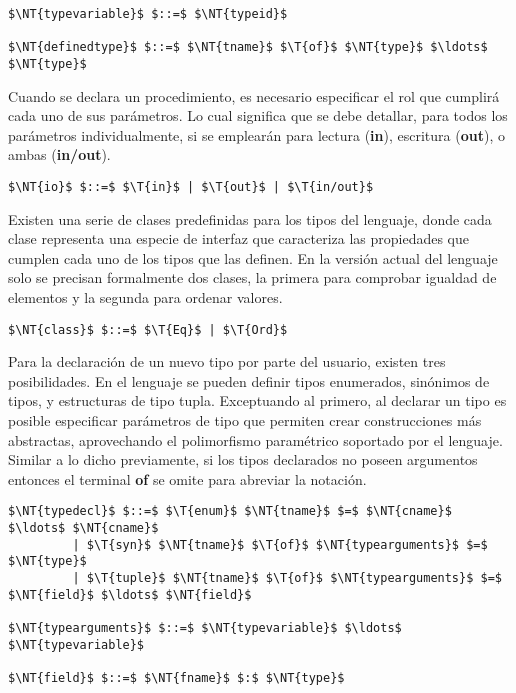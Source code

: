 \begin{lstlisting}[style = syntax]
$\NT{typevariable}$ $::=$ $\NT{typeid}$

$\NT{definedtype}$ $::=$ $\NT{tname}$ $\T{of}$ $\NT{type}$ $\ldots$ $\NT{type}$
\end{lstlisting}

Cuando se declara un procedimiento, es necesario especificar el rol que cumplirá cada uno de sus parámetros.
Lo cual significa que se debe detallar, para todos los parámetros individualmente, si se emplearán para lectura (\textbf{in}), escritura (\textbf{out}), o ambas (\textbf{in/out}).

\begin{lstlisting}[style = syntax]
$\NT{io}$ $::=$ $\T{in}$ | $\T{out}$ | $\T{in/out}$
\end{lstlisting}

Existen una serie de clases predefinidas para los tipos del lenguaje, donde cada clase representa una especie de interfaz que caracteriza las propiedades que cumplen cada uno de los tipos que las definen.
En la versión actual del lenguaje solo se precisan formalmente dos clases, la primera para comprobar igualdad de elementos y la segunda para ordenar valores.

\begin{lstlisting}[style = syntax]
$\NT{class}$ $::=$ $\T{Eq}$ | $\T{Ord}$
\end{lstlisting}

Para la declaración de un nuevo tipo por parte del usuario, existen tres posibilidades.
En el lenguaje se pueden definir tipos enumerados, sinónimos de tipos, y estructuras de tipo tupla.
Exceptuando al primero, al declarar un tipo es posible especificar parámetros de tipo que permiten crear construcciones más abstractas, aprovechando el polimorfismo paramétrico soportado por el lenguaje.
Similar a lo dicho previamente, si los tipos declarados no poseen argumentos entonces el terminal \textbf{of} se omite para abreviar la notación.

\begin{lstlisting}[style = syntax]
$\NT{typedecl}$ $::=$ $\T{enum}$ $\NT{tname}$ $=$ $\NT{cname}$ $\ldots$ $\NT{cname}$
         | $\T{syn}$ $\NT{tname}$ $\T{of}$ $\NT{typearguments}$ $=$ $\NT{type}$
         | $\T{tuple}$ $\NT{tname}$ $\T{of}$ $\NT{typearguments}$ $=$ $\NT{field}$ $\ldots$ $\NT{field}$

$\NT{typearguments}$ $::=$ $\NT{typevariable}$ $\ldots$ $\NT{typevariable}$

$\NT{field}$ $::=$ $\NT{fname}$ $:$ $\NT{type}$
\end{lstlisting}

